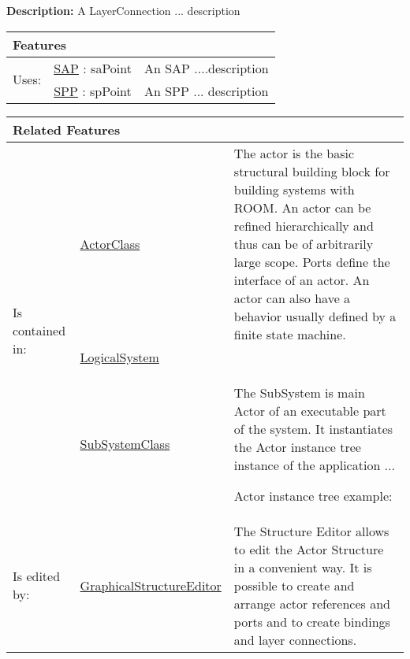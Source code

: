 			\textbf{Description:} A LayerConnection ... description 
			
			
			\begingroup
			\renewcommand{\arraystretch}{1.8} %
			\begin{longtable}{p{2.5cm}|p{4cm} p{}}
				\multicolumn{2}{l}{\textbf{\large Features}} & \\
				\hline
			\multirow{2}{*}{Uses:} & \tabitem \hyperlink{ref:SAP}{SAP} : saPoint & An SAP ....description \\
			& \tabitem \hyperlink{ref:SPP}{SPP} : spPoint & An SPP ... description \\
			\hline
			\end{longtable}
			\endgroup
			
			\begingroup
			\renewcommand{\arraystretch}{1.8} %
			\begin{longtable}{p{2.5cm}|p{4cm} p{}}
				\multicolumn{2}{l}{\textbf{\large Related Features}} & \\
				\hline
			\multirow{3}{*}{Is contained in:} & \tabitem \hyperlink{ref:ActorClass}{ActorClass}  & The actor is the basic structural building block for building systems with ROOM. An actor can be refined hierarchically and thus can be of arbitrarily large scope. Ports define the interface of an actor. An actor can also have a behavior usually defined by a finite state machine. \\
			& \tabitem \hyperlink{ref:LogicalSystem}{LogicalSystem}  &  \\
			& \tabitem \hyperlink{ref:SubSystemClass}{SubSystemClass}  & The SubSystem is main Actor of an executable part of the system. It instantiates the Actor instance tree instance of the application ...
				
				Actor instance tree example:
			 \\
			\hline
			Is edited by: & \tabitem \hyperlink{ref:GraphicalStructureEditor}{GraphicalStructureEditor}  & The Structure Editor allows to edit the Actor Structure in a convenient way. It is possible to create and arrange actor references and ports and to create bindings and layer connections.\\
			\hline
			\end{longtable}
			\endgroup
			
			
			
		\vspace{\baselineskip}
		\vspace{\baselineskip}
		\vspace{\baselineskip}
		

